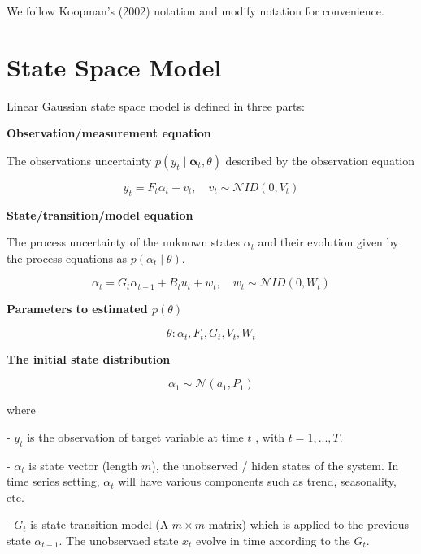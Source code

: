 

\label{chapter:appendixA}

%

We follow Koopman's (2002) notation and modify notation for convenience. 


\section{State Space Model}


Linear Gaussian state space model is defined in three parts:



\textbf{Observation/measurement equation}


The observations uncertainty $p(y_{t} \mid \mathbf{\alpha}_{t},\theta)$ described by the observation equation

$$y_{t} = F_{t}\alpha_{t}+v_{t},\quad  v_{t}\sim \mathcal NID(0,V_{t})$$



\textbf{State/transition/model equation} 


The process uncertainty of the unknown states $\alpha_{t}$ and their evolution given by the process equations as $p(\alpha_{t} \mid \theta)$.  


$$\alpha_{t} = G_{t}\alpha_{t-1}+B_{t} u_{t}+w_{t},\quad  w_{t}\sim \mathcal NID(0,W_{t})$$


\textbf{Parameters to estimated $p(\theta)$ }


$$\theta : { \alpha_t, F_t,  G_t ,V_{t}, W_{t} }$$


\textbf{The initial state distribution }



$$\alpha_{1}\sim \mathcal N(a_1,P_{1})$$




where 


-  $y_{t}$ is the observation of target variable  at time $t$ , with $t = 1,..., T$.



-  $\alpha_t$ is state vector (length $m$), the unobserved / hiden states of the system. In time series setting, $\alpha_t$ will have various components such as trend, seasonality, etc.  







-  $G_t$ is state transition model (A $m \times m$ matrix) which is applied to the previous state $\alpha_{t-1}$. The unobservaed state $x_t$ evolve in time according to the $G_t$. 







